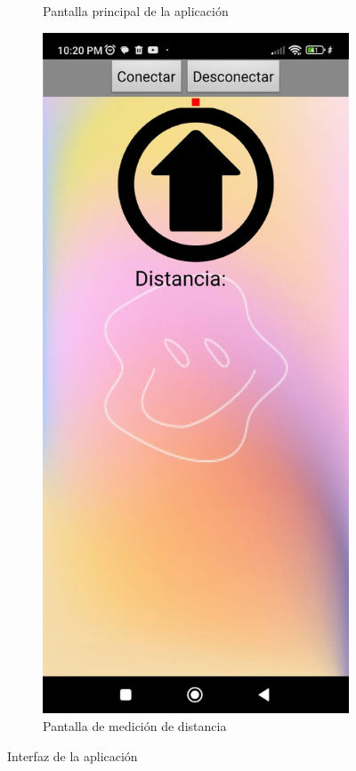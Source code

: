 \begin{figure}[H]
\begin{subfigure}[b]{0.4\textwidth}
        \caption{Pantalla principal de la aplicación}
    \end{subfigure}
    \begin{subfigure}[b]{0.4\textwidth}
        \centering
        \includegraphics[width=\textwidth]{Figures/0. General/app_screenshot_2.png}
        \caption{Pantalla de medición de distancia}
    \end{subfigure}
    \caption{Interfaz de la aplicación}
\end{figure}

